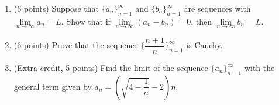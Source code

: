 \documentclass[fleqn]{article}
\begin{document}
\begin{enumerate}
    \item (6 points) Suppose that $\{a_n\}_{n=1}^{\infty}$ and $\{b_n\}_{n=1}^{\infty}$ are sequences with $\lim\limits_{n\to\infty} a_n=L$.
    Show that if $\lim\limits_{n\to\infty} (a_n-b_n)=0$, then $\lim\limits_{n\to\infty} b_n=L$.



    \item (6 points) Prove that the sequence $\{\dfrac{n+1}{n}\}_{n=1}^{\infty}$ is Cauchy.




    \item (Extra credit, 5 points) Find the limit of the sequence $\{a_n\}_{n=1}^{\infty}$ with the general term given by 
    $a_n=\left(\sqrt{4-\dfrac{1}{n}}-2\right)n$.



  \end{enumerate}
\end{document}
